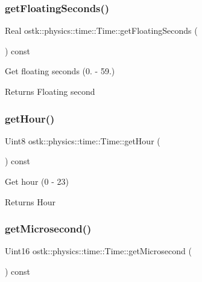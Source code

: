 \subsubsection{\texorpdfstring{get\+Floating\+Seconds()}{getFloatingSeconds()}}
{\footnotesize\ttfamily Real ostk\+::physics\+::time\+::\+Time\+::get\+Floating\+Seconds (\begin{DoxyParamCaption}{ }\end{DoxyParamCaption}) const}



Get floating seconds (0. -\/ 59.) 

\begin{DoxyReturn}{Returns}
Floating second 
\end{DoxyReturn}
\mbox{\label{classostk_1_1physics_1_1time_1_1_time_adc56fbb417453265e6d5a448e597fd76}} 
\subsubsection{\texorpdfstring{get\+Hour()}{getHour()}}
{\footnotesize\ttfamily Uint8 ostk\+::physics\+::time\+::\+Time\+::get\+Hour (\begin{DoxyParamCaption}{ }\end{DoxyParamCaption}) const}



Get hour (0 -\/ 23) 

\begin{DoxyReturn}{Returns}
Hour 
\end{DoxyReturn}
\mbox{\label{classostk_1_1physics_1_1time_1_1_time_acb4915ca99f2065f6d777d96833337db}} 
\subsubsection{\texorpdfstring{get\+Microsecond()}{getMicrosecond()}}
{\footnotesize\ttfamily Uint16 ostk\+::physics\+::time\+::\+Time\+::get\+Microsecond (\begin{DoxyParamCaption}{ }\end{DoxyParamCaption}) const}



